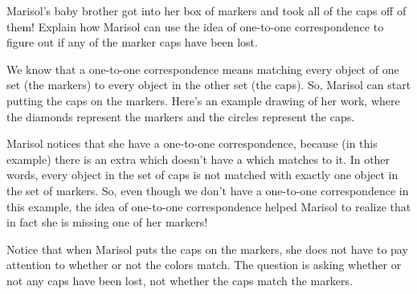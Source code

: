 \documentclass{ximera}
\begin{document}
\begin{example}
Marisol's baby brother got into her box of markers and took all of the caps off of them! Explain how Marisol can  use the idea of one-to-one correspondence to figure out if any of the marker caps have been lost. 


\begin{explanation} 
We know that a one-to-one correspondence means matching every object of one set (the markers) to every object in the other set (the caps). So, Marisol can start putting the caps on the markers. Here's an example drawing of her work, where the diamonds represent the markers and the circles represent the caps.
\begin{center}
\end{center}
Marisol notices that she  have a one-to-one correspondence, because (in this example) there is an extra  which doesn't have a  which matches to it. In other words, every object in the set of caps is not matched with exactly one object in the set of markers. So, even though we don't have a one-to-one correspondence in this example, the idea of one-to-one correspondence helped Marisol to realize that in fact she is missing one of her markers!
\end{explanation}
\end{example}


Notice that when Marisol puts the caps on the markers, she does not have to pay attention to whether or not the colors match. The question is asking whether or not any caps have been lost, not whether the caps match the markers.
\end{document}
